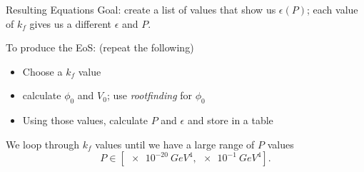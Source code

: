 \documentclass[handout]{beamer}
\begin{document}
    \begin{frame}{Resulting Equations}
        \pause Goal: \pause create a list of values that show us $\epsilon(P)$; \pause each value of $k_f$ gives us a different $\epsilon$ and $P$. \pause

        \medskip
        To produce the EoS: \pause (repeat the following) \pause
        \begin{itemize}
            \item Choose a $k_f$ value \pause
            \item calculate $\phi_0$ and $V_0$\pause; use \textit{rootfinding} for $\phi_0$\pause
            \item Using those values, calculate $P$ and $\epsilon$ and store in a table
        \end{itemize}
        We loop through $k_f$ values until we have a large range of $P$ values \[P\in[\SI{e-20}{GeV^4}, \SI{e-1}{GeV^4}].\]
    \end{frame}


    
\end{document}
